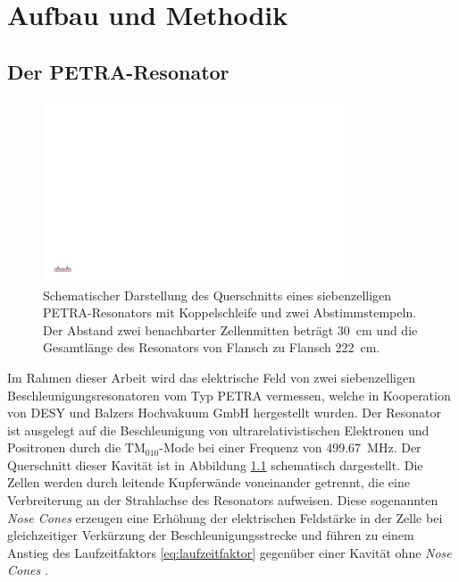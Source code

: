 \chapter{Aufbau und Methodik}
\label{sec:aufbau_und_methodik}

\section{Der PETRA-Resonator}
\label{sec:petra_resonator}
\begin{figure}[htb]
  \centering
  \includegraphics[width=0.8\textwidth]{./figs/cavity/cavity.pdf}
  \caption[Schematische Darstellung des Querschnitts eines siebenzelligen PETRA-Resonators mit Koppelschleife und zwei Abstimmstempeln]{Schematischer Darstellung des Querschnitts eines siebenzelligen PETRA-Resonators mit Koppelschleife und zwei Abstimmstempeln. Der Abstand zwei benachbarter Zellenmitten beträgt \SI{30}{\centi\metre} und die Gesamtlänge des Resonators von Flansch zu Flansch \SI{222}{\centi\metre}.}
  \label{fig:petra_cavity}
\end{figure}
Im Rahmen dieser Arbeit wird das elektrische Feld von zwei siebenzelligen Beschleunigungsresonatoren vom Typ PETRA \cite{desy_petra} vermessen, welche in Kooperation von DESY und Balzers Hochvakuum GmbH hergestellt wurden.
Der Resonator ist ausgelegt auf die Beschleunigung von ultrarelativistischen Elektronen und Positronen durch die $\mathrm{TM}_{010}$-Mode bei einer Frequenz von \SI{499.67}{MHz}.
Der Querschnitt dieser Kavität ist in Abbildung \ref{fig:petra_cavity} schematisch dargestellt.
Die Zellen werden durch leitende Kupferwände voneinander getrennt, die eine Verbreiterung an der Strahlachse des Resonators aufweisen.
Diese sogenannten \textit{Nose Cones} erzeugen eine Erhöhung der elektrischen Feldstärke in der Zelle bei gleichzeitiger Verkürzung der Beschleunigungsstrecke und führen zu einem Anstieg des Laufzeitfaktors \eqref{eq:laufzeitfaktor} gegenüber einer Kavität ohne \textit{Nose Cones} \cite[S.\ 48]{wangler}.

